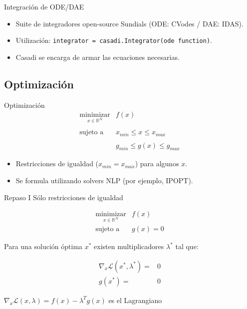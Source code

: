 \documentclass{beamer}
\begin{document}
\begin{frame}{Integración de ODE/DAE}
    \begin{itemize}
    \item Suite de integradores open-source Sundials (ODE: CVodes / DAE: IDAS).
    \item Utilización: \texttt{integrator = casadi.Integrator(ode function)}.
    \item Casadi se encarga de armar las ecuaciones necesarias.
    \end{itemize}
\end{frame}

\subsection{Optimización}

\begin{frame}{Optimización}
\begin{equation}
\begin{array}{cl}
\underset{x \in \mathbb{R}^N}{\text{minimizar}}  & \displaystyle f(x) \\\\
\text{sujeto a}
& x_{min} \leq x \leq x_{max}   \\\\
& g_{min} \leq g(x) \leq g_{max}
\end{array}
\end{equation}

\begin{itemize}
\item Restricciones de igualdad ($x_{min} = x_{max}$) para algunos $x$.
\item Se formula utilizando solvers NLP (por ejemplo, IPOPT).
\end{itemize}

\end{frame}

\begin{frame}{Repaso I}
Sólo restricciones de igualdad

\begin{equation}
\begin{array}{cl}
\underset{x \in \mathbb{R}^N}{\text{minimizar}}  & \displaystyle f(x) \\
\text{sujeto a}
& g(x) = 0
\end{array}
\end{equation}

Para una solución óptima $x^*$ existen multiplicadores $\lambda^*$ tal que:

\begin{equation}
\begin{array}{rl}
 \nabla_x \mathcal{L}(x^*, \lambda^*) =& 0  \\
 g(x^*) =& 0 
\end{array}
\end{equation}

$\nabla_x \mathcal{L}(x,\lambda) = f(x) - \lambda^T g(x)$ es el Lagrangiano 

\end{frame}
\end{document}

